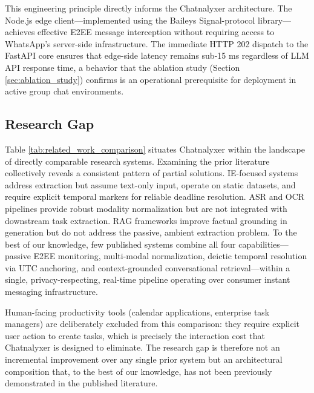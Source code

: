 This engineering principle directly informs the Chatnalyxer architecture. The Node.js edge client—implemented using the Baileys Signal-protocol library—achieves effective E2EE message interception without requiring access to WhatsApp's server-side infrastructure. The immediate HTTP 202 dispatch to the FastAPI core ensures that edge-side latency remains sub-15 ms regardless of LLM API response time, a behavior that the ablation study (Section \ref{sec:ablation_study}) confirms is an operational prerequisite for deployment in active group chat environments.

\subsection{Research Gap}

Table \ref{tab:related_work_comparison} situates Chatnalyxer within the landscape of directly comparable research systems. Examining the prior literature collectively reveals a consistent pattern of partial solutions. IE-focused systems \cite{lample2016,hsu2022degree} address extraction but assume text-only input, operate on static datasets, and require explicit temporal markers for reliable deadline resolution. ASR and OCR pipelines \cite{radford2022whisper,shi2017crnn,liao2020mask} provide robust modality normalization but are not integrated with downstream task extraction. RAG frameworks \cite{lewis2020rag,shuster2021retrieval} improve factual grounding in generation but do not address the passive, ambient extraction problem. To the best of our knowledge, few published systems combine all four capabilities—passive E2EE monitoring, multi-modal normalization, deictic temporal resolution via UTC anchoring, and context-grounded conversational retrieval—within a single, privacy-respecting, real-time pipeline operating over consumer instant messaging infrastructure.

Human-facing productivity tools (calendar applications, enterprise task managers) are deliberately excluded from this comparison: they require explicit user action to create tasks, which is precisely the interaction cost that Chatnalyxer is designed to eliminate. The research gap is therefore not an incremental improvement over any single prior system but an architectural composition that, to the best of our knowledge, has not been previously demonstrated in the published literature.
